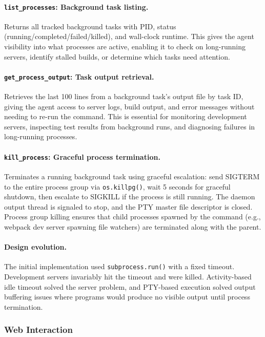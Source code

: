 \paragraph{\texttt{list\_processes}: Background task listing.} Returns all tracked background tasks with PID, status (running/completed/failed/killed), and wall-clock runtime. This gives the agent visibility into what processes are active, enabling it to check on long-running servers, identify stalled builds, or determine which tasks need attention.

\paragraph{\texttt{get\_process\_output}: Task output retrieval.} Retrieves the last 100 lines from a background task's output file by task ID, giving the agent access to server logs, build output, and error messages without needing to re-run the command. This is essential for monitoring development servers, inspecting test results from background runs, and diagnosing failures in long-running processes.

\paragraph{\texttt{kill\_process}: Graceful process termination.} Terminates a running background task using graceful escalation: send SIGTERM to the entire process group via \texttt{os.killpg()}, wait 5 seconds for graceful shutdown, then escalate to SIGKILL if the process is still running. The daemon output thread is signaled to stop, and the PTY master file descriptor is closed. Process group killing ensures that child processes spawned by the command (e.g., webpack dev server spawning file watchers) are terminated along with the parent.

\paragraph{Design evolution.} The initial implementation used \texttt{subprocess.run()} with a fixed timeout. Development servers invariably hit the timeout and were killed. Activity-based idle timeout solved the server problem, and PTY-based execution solved output buffering issues where programs would produce no visible output until process termination.

\subsubsection{Web Interaction}
\label{sec:web_tools}

